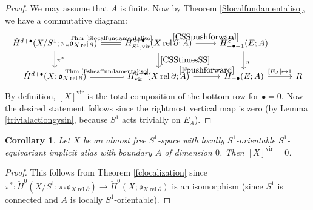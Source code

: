 \documentclass[12pt]{article}
\newtheorem{corollary}[theorem]{Corollary}
\theoremstyle{definition}
\theoremstyle{remark}
\numberwithin{equation}{subsection}
\newcommand{\oo}{\mathfrak o}
\newcommand{\cH}{\check H}
\newcommand{\vir}{\mathrm{vir}}
\newcommand{\rel}{\operatorname{rel}}
\begin{document}
\begin{proof}
We may assume that $A$ is finite.  Now by Theorem \ref{Slocalfundamentaliso}, we have a commutative diagram:
\begin{equation*}%
\begin{tikzcd}
\cH^{d+\bullet}(X/S^1;\pi_\ast\oo_{X\rel\partial})\ar{d}{\pi^\ast}\ar[equal]{r}{\text{Thm \ref{Slocalfundamentaliso}}}&H^{d+\bullet}_{S^1,\vir}(X\rel\partial;A)\ar{d}{\eqref{CSStimesSS}}\ar{r}{\eqref{CSSpushforward}}&H_{-\bullet-1}^{S^1}(E;A)\ar{d}{\pi^!}\\
\cH^{d+\bullet}(X;\oo_{X\rel\partial})\ar[equal]{r}{\text{Thm \ref{Fsheaffundamentaliso}}}&H^{d+\bullet}_\vir(X\rel\partial;A)\ar{r}{\eqref{Fpushforward}}&H_{-\bullet}(E;A)\ar{r}{[E_A]\mapsto 1}&R
\end{tikzcd}
\end{equation*}
By definition, $[X]^\vir$ is the total composition of the bottom row for $\bullet=0$.  Now the desired statement follows since the rightmost vertical map is zero (by Lemma \ref{trivialactiongysin}, because $S^1$ acts trivially on $E_A$).
\end{proof}

\begin{corollary}
Let $X$ be an almost free $S^1$-space with locally $S^1$-orientable $S^1$-equivariant implicit atlas with boundary $A$ of dimension $0$.  Then $[X]^\vir=0$.
\end{corollary}

\begin{proof}
This follows from Theorem \ref{fclocalization} since $\pi^\ast:\cH^0(X/S^1;\pi_\ast\oo_{X\rel\partial})\to\cH^0(X;\oo_{X\rel\partial})$ is an isomorphism (since $S^1$ is connected and $A$ is locally $S^1$-orientable).
\end{proof}
\end{document}
